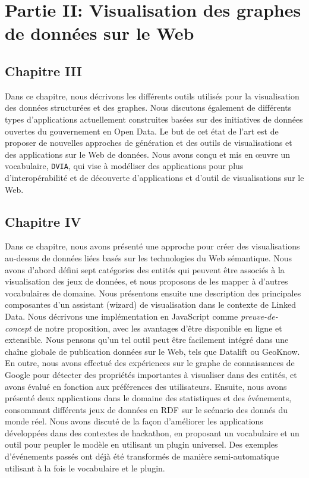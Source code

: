 \documentclass[a4paper,11pt,twoside]{report}
\begin{document}
\chapter*{Partie II: Visualisation des graphes de données sur le Web}

\section*{Chapitre III}


Dans ce chapitre, nous décrivons les différents outils utilisés pour la visualisation des données structurées et des graphes. Nous discutons également de différents types d'applications actuellement construites basées sur des initiatives de données ouvertes du gouvernement en Open Data. Le but de cet état de l'art est de proposer de nouvelles approches de génération et des outils de visualisations et des applications sur le Web de données. Nous avons conçu et mis en œuvre un vocabulaire, \texttt{DVIA}, qui vise à modéliser des applications pour plus d'interopérabilité et de découverte d'applications et d'outil de visualisations  sur le Web.

\section*{Chapitre IV}


Dans ce chapitre, nous avons présenté une approche pour créer des visualisations au-dessus de données liées basés sur les technologies du Web sémantique. Nous avons d'abord défini sept catégories des entités qui peuvent être associés à la visualisation des jeux de données, et nous proposons de les mapper à d'autres vocabulaires de domaine. Nous présentons ensuite une description des principales composantes d'un assistant (wizard) de visualisation dans le contexte de Linked Data. Nous décrivons une implémentation en JavaScript comme \textit{preuve-de-concept} de notre proposition, avec les avantages d'être disponible en ligne et extensible. Nous pensons qu'un tel outil peut être facilement intégré dans une chaîne globale de  publication données sur le Web, tels que Datalift ou GeoKnow. En outre, nous avons effectué des expériences sur le graphe de connaissances de Google pour détecter des propriétés importantes à visualiser dans des entités, et avons évalué en fonction aux préférences des utilisateurs. Ensuite, nous avons présenté deux applications dans le domaine des statistiques et des événements, consommant différents jeux de données en RDF sur le scénario des donnés du monde réel. Nous avons discuté de la façon d'améliorer les applications développées dans des contextes de hackathon, en proposant un vocabulaire et un outil pour peupler le modèle en utilisant un plugin universel. Des exemples d'événements passés ont déjà été transformés de manière semi-automatique utilisant à la fois le vocabulaire et le plugin.
\end{document}
